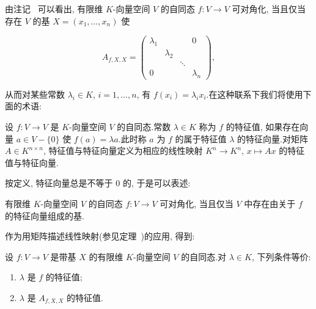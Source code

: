 由注记~ 可以看出, 有限维 $K$-向量空间 $V$ 的自同态 $f \colon V \longrightarrow V$ 可对角化, 当且仅当存在 $V$ 的基 $X = (x_1, \ldots, x_n)$ 使

\[
A_{f, X, X} = \left(\begin{array}{cccc}
\lambda_1 & & & 0 \\
 & \lambda_2 & & \\
 & & \ddots & \\
0 & & & \lambda_n
\end{array}\right),\]

从而对某些常数 $\lambda_i \in K$, $i = 1, \ldots, n$, 有 $f(x_i) = \lambda_i x_i$.在这种联系下我们将使用下面的术语:

\begin{definition}[特征值与特征向量]\label{def:6.1.4}
设 $f \colon V \longrightarrow V$ 是 $K$-向量空间 $V$ 的自同态.常数 $\lambda \in K$ 称为 $f$ 的特征值, 如果存在向量 $a \in V - \{0\}$ 使 $f(a) = \lambda a$.此时称 $a$ 为 $f$ 的属于特征值 $\lambda$ 的特征向量.对矩阵 $A \in K^{n \times n}$, 特征值与特征向量定义为相应的线性映射 $K^n \longrightarrow K^n$, $x \longmapsto Ax$ 的特征值与特征向量.
\end{definition}

按定义, 特征向量总是不等于 $0$ 的, 于是可以表述:

\begin{remark}\label{rem:6.1.5}
有限维 $K$-向量空间 $V$ 的自同态 $f \colon V \longrightarrow V$ 可对角化, 当且仅当 $V$ 中存在由关于 $f$ 的特征向量组成的基.
\end{remark}

作为用矩阵描述线性映射(参见定理~)的应用, 得到:

\begin{remark}\label{rem:6.1.6}
设 $f \colon V \longrightarrow V$ 是带基 $X$ 的有限维 $K$-向量空间 $V$ 的自同态.对 $\lambda \in K$, 下列条件等价:
\begin{enumerate}
\item[(i)] $\lambda$ 是 $f$ 的特征值;
\item[(ii)] $\lambda$ 是 $A_{f, X, X}$ 的特征值.
\end{enumerate}
\end{remark}


